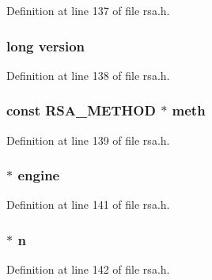 Definition at line 137 of file rsa.\+h.

\subsubsection[{\texorpdfstring{version}{version}}]{\setlength{\rightskip}{0pt plus 5cm}long version}\hypertarget{structrsa__st_a17afc5cf84cee4b2123665f28ce85c9f}{}\label{structrsa__st_a17afc5cf84cee4b2123665f28ce85c9f}


Definition at line 138 of file rsa.\+h.

\subsubsection[{\texorpdfstring{meth}{meth}}]{\setlength{\rightskip}{0pt plus 5cm}const {\bf R\+S\+A\+\_\+\+M\+E\+T\+H\+OD} $\ast$ meth}\hypertarget{structrsa__st_a0ca399c95ccef91cb794b24b867d09a5}{}\label{structrsa__st_a0ca399c95ccef91cb794b24b867d09a5}


Definition at line 139 of file rsa.\+h.

\subsubsection[{\texorpdfstring{engine}{engine}}]{ $\ast$ engine}\hypertarget{structrsa__st_ae4bca26806adfdaf8a28463c98ddf03a}{}\label{structrsa__st_ae4bca26806adfdaf8a28463c98ddf03a}


Definition at line 141 of file rsa.\+h.

\subsubsection[{\texorpdfstring{n}{n}}]{ $\ast$ n}\hypertarget{structrsa__st_ab3b67230e6d25749ea84508e84e3c708}{}\label{structrsa__st_ab3b67230e6d25749ea84508e84e3c708}


Definition at line 142 of file rsa.\+h.

